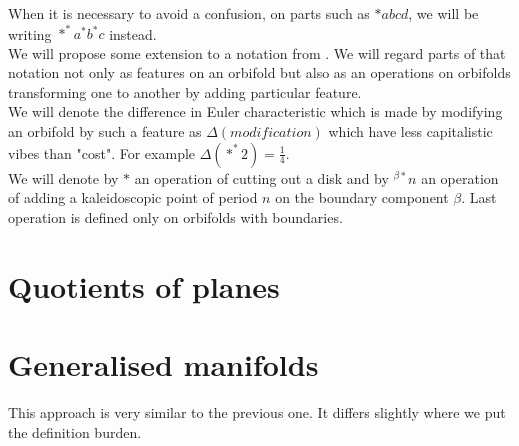 When it is necessary to avoid a confusion, on parts such as $*abcd$, we will be writing 
$*^*a^*b^*c$ instead. \\
We will propose some extension to a notation from \cite{Conway2008}.
We will regard parts of that notation not only as features on an orbifold but also as an operations 
on orbifolds transforming one to another by adding particular feature. \\
We will denote the difference in Euler characteristic which is made by modifying 
an orbifold by such a feature as $\Delta(modification)$ 
which have less capitalistic vibes than "cost". 
For example $\Delta(*^*2) = \frac{1}{4}$. \\
We will denote by $*$ an operation of cutting out a disk and by $^{\beta*}n$ an operation of 
adding a kaleidoscopic point of period $n$ on the boundary component $\beta$. 
Last operation is defined only on orbifolds with boundaries.


\section{Quotients of planes}

\section{Generalised manifolds}
This approach is very similar to the previous one. It differs slightly where we put the 
definition burden. 



